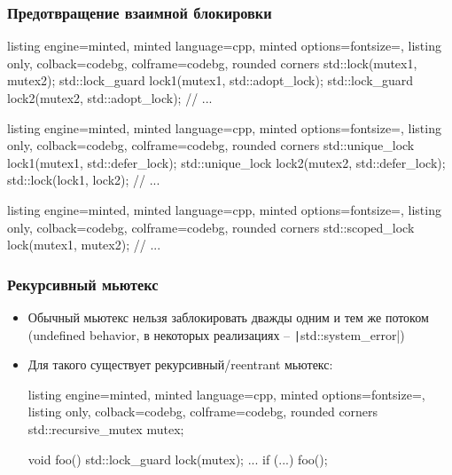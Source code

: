 \documentclass[10pt]{beamer}
\begin{document}
\begin{frame}[fragile]
\frametitle{Предотвращение взаимной блокировки}
\begin{itemize}
\begin{tcblisting}{listing engine=minted, minted language=cpp, minted options={fontsize=\scriptsize}, listing only, colback=codebg, colframe=codebg, rounded corners}
std::lock(mutex1, mutex2);
std::lock_guard lock1(mutex1, std::adopt_lock);
std::lock_guard lock2(mutex2, std::adopt_lock);
// ...
\end{tcblisting}
\pause
{}
\begin{tcblisting}{listing engine=minted, minted language=cpp, minted options={fontsize=\scriptsize}, listing only, colback=codebg, colframe=codebg, rounded corners}
std::unique_lock lock1(mutex1, std::defer_lock);
std::unique_lock lock2(mutex2, std::defer_lock);
std::lock(lock1, lock2);
// ...
\end{tcblisting}
\pause
{}
\begin{tcblisting}{listing engine=minted, minted language=cpp, minted options={fontsize=\scriptsize}, listing only, colback=codebg, colframe=codebg, rounded corners}
std::scoped_lock lock(mutex1, mutex2);
// ...
\end{tcblisting}
\end{itemize}
\end{frame}

\begin{frame}[fragile]
\frametitle{Рекурсивный мьютекс}
\begin{itemize}
\item Обычный мьютекс нельзя заблокировать дважды одним и тем же потоком (undefined behavior, в некоторых реализациях -- \texttt|std::system_error|)
\pause
\item Для такого существует рекурсивный/reentrant мьютекс:
\begin{tcblisting}{listing engine=minted, minted language=cpp, minted options={fontsize=\scriptsize}, listing only, colback=codebg, colframe=codebg, rounded corners}
std::recursive_mutex mutex;

void foo() {
  std::lock_guard lock(mutex);
  ...
  if (...) {
    foo();
  }
}
\end{tcblisting}
\end{itemize}
\end{frame}
\end{document}
